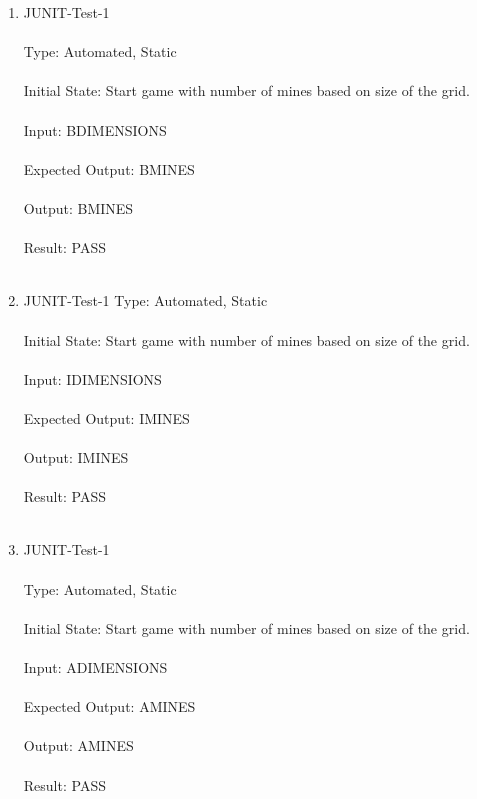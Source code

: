 \documentclass[12pt, titlepage]{article}
\begin{document}
\begin{enumerate}
\item{JUNIT-Test-1}\\\\
Type: Automated, Static\\\\			
Initial State: Start game with number of mines based on size of the grid.\\\\
Input: BDIMENSIONS\\\\
Expected Output: BMINES\\\\
Output: BMINES\\\\
Result: PASS\\\\

\item{JUNIT-Test-1}
Type: Automated, Static\\\\			
Initial State: Start game with number of mines based on size of the grid.\\\\
Input: IDIMENSIONS\\\\
Expected Output: IMINES\\\\
Output: IMINES\\\\
Result: PASS\\\\

\newpage
\item{JUNIT-Test-1}\\\\
Type: Automated, Static\\\\			
Initial State: Start game with number of mines based on size of the grid.\\\\
Input: ADIMENSIONS\\\\
Expected Output: AMINES\\\\
Output: AMINES\\\\
Result: PASS\\\\


\end{enumerate}
\end{document}
